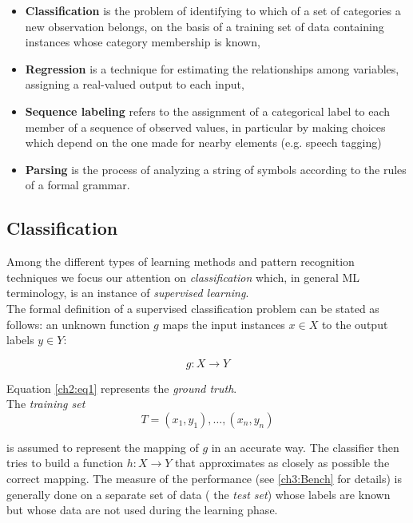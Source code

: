 \begin{itemize}
 \item \textbf{Classification} is the problem of identifying to which of a set of categories a new observation belongs, on the basis
 of a training set of data containing instances whose category membership is known,
 \item \textbf{Regression} is a technique for estimating the relationships among variables, assigning a real-valued output to each input,
 \item \textbf{Sequence labeling} refers to the assignment of a categorical label to each member of a sequence of observed values,
 in particular by making choices which depend on the one made for nearby elements (e.g. speech tagging)
 \item \textbf{Parsing} is the process of analyzing a string of symbols according to the rules of a formal grammar.
\end{itemize}

\subsection{Classification}

Among the different types of learning methods and pattern recognition techniques we focus our attention on \textit{classification} which, in general \Gls{ML} 
terminology, is an instance of \textit{supervised learning}.\\
The formal definition of a supervised classification problem can be stated as follows: an unknown function $g$ maps the input instances $x \in X$ to the output labels $y \in Y$:

\begin{equation}
 \label{ch2:eq1}
 g: X \rightarrow Y
\end{equation}

Equation \ref{ch2:eq1} represents the \textit{ground truth}.\\
The \textit{training set}
\begin{equation}
 T = { (x_1,y_1), \ldots ,(x_n,y_n) }
\end{equation}

is assumed to represent the mapping of $g$ in an accurate way. The classifier then tries to build a function $h: X \rightarrow Y$ that approximates as closely as possible the correct mapping. The measure of the performance
(see \ref{ch3:Bench} for details) is generally done on a separate set of data ( the \textit{test set}) whose labels are known but whose data are not used during the learning phase\cite{liu2006pattern}.

